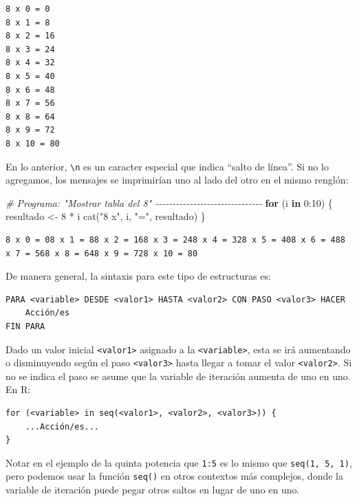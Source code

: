 \documentclass[
]{book}
\newenvironment{Shaded}{\begin{snugshade}}{\end{snugshade}}
\newcommand{\CommentTok}[1]{\textcolor[rgb]{0.56,0.35,0.01}{\textit{#1}}}
\newcommand{\ControlFlowTok}[1]{\textcolor[rgb]{0.13,0.29,0.53}{\textbf{#1}}}
\newcommand{\DecValTok}[1]{\textcolor[rgb]{0.00,0.00,0.81}{#1}}
\newcommand{\FunctionTok}[1]{\textcolor[rgb]{0.00,0.00,0.00}{#1}}
\newcommand{\NormalTok}[1]{#1}
\newcommand{\OtherTok}[1]{\textcolor[rgb]{0.56,0.35,0.01}{#1}}
\newcommand{\SpecialCharTok}[1]{\textcolor[rgb]{0.00,0.00,0.00}{#1}}
\newcommand{\StringTok}[1]{\textcolor[rgb]{0.31,0.60,0.02}{#1}}
\begin{document}
\begin{verbatim}
8 x 0 = 0 
8 x 1 = 8 
8 x 2 = 16 
8 x 3 = 24 
8 x 4 = 32 
8 x 5 = 40 
8 x 6 = 48 
8 x 7 = 56 
8 x 8 = 64 
8 x 9 = 72 
8 x 10 = 80 
\end{verbatim}

En lo anterior, \texttt{\textbackslash{}n} es un caracter especial que indica ``salto de línea''. Si no lo agregamos, los mensajes se imprimirían uno al lado del otro en el mismo renglón:

\begin{Shaded}
\begin{Highlighting}[]
\CommentTok{\# Programa: "Mostrar tabla del 8" {-}{-}{-}{-}{-}{-}{-}{-}{-}{-}{-}{-}{-}{-}{-}{-}{-}{-}{-}{-}{-}{-}{-}{-}{-}{-}{-}{-}{-}{-}{-}}
\ControlFlowTok{for}\NormalTok{ (i }\ControlFlowTok{in} \DecValTok{0}\SpecialCharTok{:}\DecValTok{10}\NormalTok{) \{}
\NormalTok{    resultado }\OtherTok{\textless{}{-}} \DecValTok{8} \SpecialCharTok{*}\NormalTok{ i}
    \FunctionTok{cat}\NormalTok{(}\StringTok{"8 x"}\NormalTok{, i, }\StringTok{"="}\NormalTok{, resultado)}
\NormalTok{\}}
\end{Highlighting}
\end{Shaded}

\begin{verbatim}
8 x 0 = 08 x 1 = 88 x 2 = 168 x 3 = 248 x 4 = 328 x 5 = 408 x 6 = 488 x 7 = 568 x 8 = 648 x 9 = 728 x 10 = 80
\end{verbatim}

De manera general, la sintaxis para este tipo de estructuras es:

\begin{verbatim}
PARA <variable> DESDE <valor1> HASTA <valor2> CON PASO <valor3> HACER
    Acción/es
FIN PARA
\end{verbatim}

Dado un valor inicial \texttt{\textless{}valor1\textgreater{}} asignado a la \texttt{\textless{}variable\textgreater{}}, esta se irá aumentando o disminuyendo según el paso \texttt{\textless{}valor3\textgreater{}} hasta llegar a tomar el valor \texttt{\textless{}valor2\textgreater{}}. Si no se indica el paso se asume que la variable de iteración aumenta de uno en uno. En R:

\begin{verbatim}
for (<variable> in seq(<valor1>, <valor2>, <valor3>)) {
    ...Acción/es...
}
\end{verbatim}

Notar en el ejemplo de la quinta potencia que \texttt{1:5} es lo mismo que \texttt{seq(1,\ 5,\ 1)}, pero podemos usar la función \texttt{seq()} en otros contextos más complejos, donde la variable de iteración puede pegar otros saltos en lugar de uno en uno.
\end{document}
